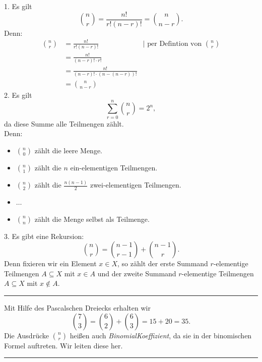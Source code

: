 \documentclass[9pt]{article}
\begin{document}
\begin{bem}
1. Es gilt 
\[
\binom{n}{r} = \frac{n!}{r!(n-r)!} = \binom{n}{n-r}.
\]
\color{Blue}
Denn: 
\begin{align*}
    \binom{n}{r} & = \frac{n!}{r!(n-r)!}  & | \text{ per Defintion von } \binom{n}{r} \\
    & = \frac{n!}{(n - r)! \cdot r!} \\
    & =  \frac{n!}{(n - r)! \cdot (n - (n - r))!} \\
   & =  \binom{n}{n - r}  
\end{align*}
\color{black}
2. Es gilt 
\[
\sum_{r=0}^{n} \binom{n}{r} = 2^n,
\]
da diese Summe alle Teilmengen zählt. \\
\color{Blue}
Denn: 
\begin{itemize}
    \item[] \(\binom{n}{0}\) zählt die leere Menge.
    \item[] \(\binom{n}{1}\) zählt die \( n \) ein-elementigen Teilmengen.
    \item[] \(\binom{n}{2}\) zählt die \( \frac{n(n-1)}{2} \) zwei-elementigen Teilmengen.
    \item[] \(\ldots\)
    \item[] \(\binom{n}{n}\) zählt die Menge selbst als Teilmenge.
\end{itemize}
\color{black}
3. Es gibt eine Rekursion:
\[
\binom{n}{r} = \binom{n - 1}{r - 1} + \binom{n - 1}{r}.
\]
Denn fixieren wir ein Element $x \in X$, so zählt der erste Summand $r$-elementige Teilmengen $A \subseteq X$ mit $x \in A$ und der zweite Summand $r$-elementige Teilmengen $A \subseteq X$ mit $x \notin A$.
\txc{\[
\binom{n}{r} = \underbrace{\binom{n - 1}{r - 1}}_{\text{Teilmengen mit } x\in A} + \overbrace{\binom{n - 1}{r}}^{\text{Teilmengen mit } x \notin A}.
\]}
\end{bem} \noindent \rule{8cm}{0.4pt}
\begin{bsp}
Mit Hilfe des Pascalschen Dreiecks erhalten wir 
\[
\binom{7}{3} = \binom{6}{2} + \binom{6}{3} = 15 + 20 = 35.
\]
Die Ausdrücke $\binom{n}{r}$ heißen auch \textit{BinomialKoeffizient}, da sie in der binomischen Formel auftreten. Wir leiten diese her.

\end{bsp} \noindent \rule{8cm}{0.4pt}
\end{document}
